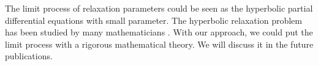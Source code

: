 \documentclass[a4paper]{article}
\begin{document}
The limit process of relaxation parameters could be seen as the hyperbolic partial differential equations with small parameter. The hyperbolic relaxation problem has been studied by many mathematicians \cite{yong2001basic,chen1994hyperbolic}. With our approach, we could put the limit process with a rigorous mathematical theory. We will discuss it in the future publications.


{}

\end{document}
